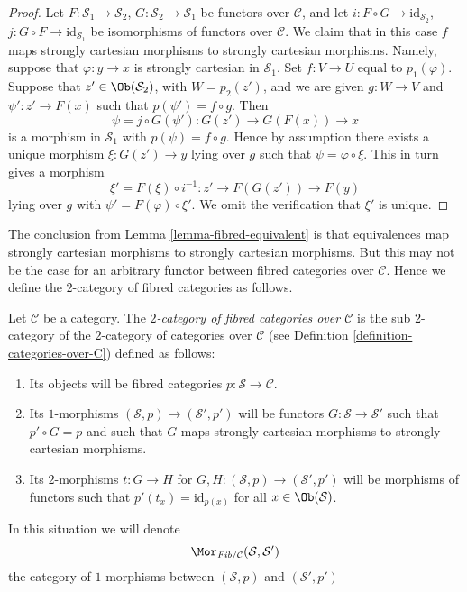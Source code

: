 \begin{proof}
Let $F : \mathcal{S}_1 \to \mathcal{S}_2$,
$G : \mathcal{S}_2 \to \mathcal{S}_1$ be functors over $\mathcal{C}$, and let
$i : F \circ G \to \text{id}_{\mathcal{S}_2}$,
$j : G \circ F \to \text{id}_{\mathcal{S}_1}$ be isomorphisms of
functors over $\mathcal{C}$.
We claim that in this case $f$ maps strongly cartesian morphisms
to strongly cartesian morphisms. Namely, suppose that
$\varphi : y \to x$ is strongly cartesian in $\mathcal{S}_1$.
Set $f : V \to U$ equal to $p_1(\varphi)$. Suppose that
$z' \in \Ob(\mathcal{S}_2)$, with $W = p_2(z')$, and we are given
$g : W \to V$ and $\psi' : z' \to F(x)$ such that
$p(\psi') = f \circ g$. Then
$$
\psi = j \circ G(\psi') : G(z') \to G(F(x)) \to x
$$
is a morphism in $\mathcal{S}_1$ with $p(\psi) = f \circ g$.
Hence by assumption there exists a unique morphism $\xi : G(z') \to y$
lying over $g$ such that $\psi = \varphi \circ \xi$. This in turn gives a
morphism
$$
\xi' = F(\xi) \circ i^{-1} : z' \to F(G(z')) \to F(y)
$$
lying over $g$ with $\psi' = F(\varphi) \circ \xi'$. We omit the verification
that $\xi'$ is unique.
\end{proof}

\noindent
The conclusion from Lemma \ref{lemma-fibred-equivalent} is that
equivalences map strongly cartesian morphisms to strongly cartesian
morphisms. But this may not be the case for an arbitrary functor between
fibred categories over $\mathcal{C}$. Hence we define the $2$-category
of fibred categories as follows.

\begin{definition}
\label{definition-fibred-categories-over-C}
Let $\mathcal{C}$ be a category.
The {\it $2$-category of fibred categories over $\mathcal{C}$}
is the sub $2$-category of the $2$-category of categories
over $\mathcal{C}$ (see Definition \ref{definition-categories-over-C})
defined as follows:
\begin{enumerate}
\item Its objects will be fibred categories
$p : \mathcal{S} \to \mathcal{C}$.
\item Its $1$-morphisms $(\mathcal{S}, p) \to (\mathcal{S}', p')$
will be functors $G : \mathcal{S} \to \mathcal{S}'$ such that
$p' \circ G = p$ and such that $G$ maps strongly cartesian
morphisms to strongly cartesian morphisms.
\item Its $2$-morphisms $t : G \to H$ for
$G, H : (\mathcal{S}, p) \to (\mathcal{S}', p')$
will be morphisms of functors
such that $p'(t_x) = \text{id}_{p(x)}$
for all $x \in \Ob(\mathcal{S})$.
\end{enumerate}
In this situation we will denote
$$
\Mor_{\textit{Fib}/\mathcal{C}}(\mathcal{S}, \mathcal{S}')
$$
the category of $1$-morphisms between
$(\mathcal{S}, p)$ and $(\mathcal{S}', p')$
\end{definition}

